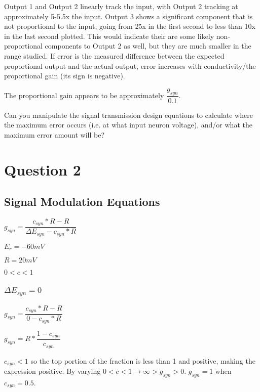 Output 1 and Output 2 linearly track the input, with Output 2 tracking at approximately 5-5.5x the input. Output 3 shows a significant component that is not proportional to the input, going from 25x in the first second to less than 10x in the last second plotted. This would indicate their are some likely non-proportional components to Output 2 as well, but they are much smaller in the range studied. If error is the measured difference between the expected proportional output and the actual output, error increases with conductivity/the proportional gain (its sign is negative).

The proportional gain appears to be approximately $\dfrac{g_{syn}}{0.1}$.

Can you manipulate the signal transmission design 
equations to calculate where the maximum error occurs (i.e. at what input 
neuron voltage), and/or what the maximum error amount will be?



\section{Question 2}

\subsection{Signal Modulation Equations}

$g_{syn} = \dfrac{c_{syn} * R - R}{\Delta E_{syn} - c_{syn} * R}$

$E_{r} = -60mV$

$R = 20mV$

$0 < c < 1$

\subsubsection{$\Delta E_{syn} = 0$}

$g_{syn} = \dfrac{c_{syn} * R - R}{0 - c_{syn} * R}$

$g_{syn} = R * \dfrac{1 - c_{syn}}{c_{syn}}$

$c_{syn} < 1$ so the top portion of the fraction is less than 1 and positive, making the expression positive.
By varying $0 < c < 1 \rightarrow \infty > g_{syn} > 0$. $g_{syn} = 1$ when $c_{syn} = 0.5$.

